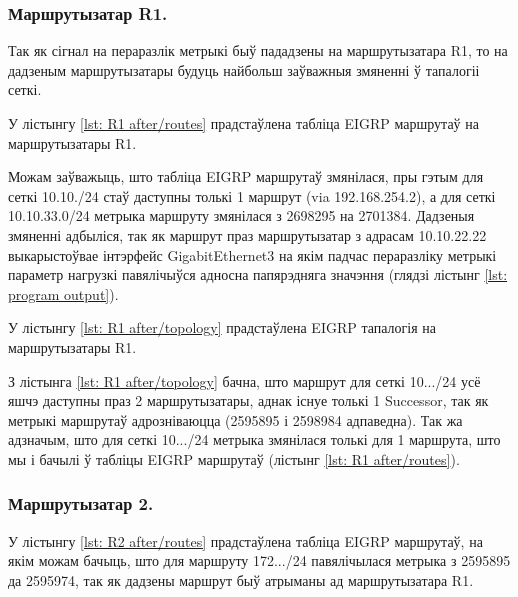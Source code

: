 \subsubsection{Маршрутызатар R1.}

Так як сігнал на пераразлік метрыкі быў пададзены на маршрутызатара R1, то на дадзеным
маршрутызатары будуць найбольш заўважныя змяненні ў тапалогіі сеткі.

У лістынгу \ref{lst: R1 after/routes} прадстаўлена табліца EIGRP маршрутаў на маршрутызатары R1.



Можам заўважыць, што табліца EIGRP маршрутаў змянілася, пры гэтым
для сеткі 10.10./24 стаў даступны толькі 1 маршрут (via 192.168.254.2), а для сеткі 10.10.33.0/24 метрыка маршруту змянілася з 2698295 на 2701384.
Дадзеныя змяненні адбыліся, так як маршрут праз маршрутызатар з адрасам
10.10.22.22 выкарыстоўвае інтэрфейс GigabitEthernet3 на якім падчас пераразліку
метрыкі параметр нагрузкі павялічыўся адносна папярэдняга значэння (глядзі лістынг \ref{lst: program output}).

У лістынгу \ref{lst: R1 after/topology} прадстаўлена EIGRP тапалогія
на маршрутызатары R1.



З лістынга \ref{lst: R1 after/topology} бачна, што маршрут для сеткі
10.../24 усё яшчэ даступны праз 2 маршрутызатары,
аднак існуе толькі 1 Successor, так як метрыкі маршрутаў адрозніваюцца
(2595895 і 2598984 адпаведна). Так жа адзначым, што для сеткі
10.../24 метрыка змянілася толькі для 1 маршрута, што
мы і бачылі ў табліцы EIGRP маршрутаў (лістынг \ref{lst: R1 after/routes}).

\subsubsection{Маршрутызатар 2.}

У лістынгу \ref{lst: R2 after/routes} прадстаўлена табліца
EIGRP маршрутаў, на якім можам бачыць, што для маршруту
172.../24 павялічылася метрыка з 2595895 да 2595974, так як
дадзены маршрут быў атрыманы ад маршрутызатара R1.

